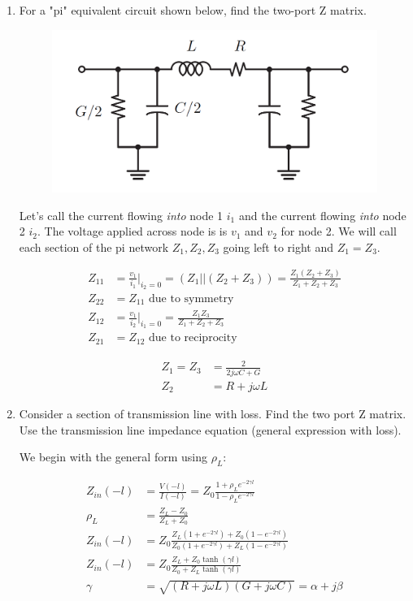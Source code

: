 \documentclass[11pt]{article}
\begin{document}
\begin{enumerate}
	\item For a "pi" equivalent circuit shown below, find the two-port Z matrix.
	\begin{figure}[H]
		\centering \includegraphics[width=\textwidth-6cm]{images/problem2_pi_network.png}
	\end{figure}

	Let's call the current flowing \emph{into} node 1 $i_1$ and the current flowing \emph{into} node 2 $i_2$. The voltage applied across node is is $v_1$ and $v_2$ for node 2. We will call each section of the pi network $Z_1, Z_2, Z_3$ going left to right and $Z_1 = Z_3$.
	
	\begin{align*}
		Z_{11} &= \frac{v_1}{i_1} \bigg\rvert_{i_2 = 0} = (Z_1 || (Z_2 + Z_3)) = \frac{Z_1(Z_2 + Z_3)}{Z_1 + Z_2 + Z_3} \\
		Z_{22} &= Z_{11} \text{ due to symmetry} \\
		Z_{12} &= \frac{v_1}{i_2} \bigg\rvert_{i_1 = 0} = \frac{Z_1 Z_3}{Z_1 + Z_2 + Z_3} \\
		Z_{21} &= Z_{12} \text{ due to reciprocity}
	\end{align*}
	
	\begin{align*}
		Z_1 = Z_3 &= \frac{2}{2j \omega C + G} \\
		Z_2 &= R + j \omega L
	\end{align*}
	
	\item Consider a section of transmission line with loss. Find the two port Z matrix. Use the transmission line impedance equation (general expression with loss).
	
	We begin with the general form using $\rho_L$:
	
	\begin{align*}
		Z_{in}(-l) &= \frac{V(-l)}{I(-l)} = Z_0 \frac{1 + \rho_L e^{-2 \gamma l}}{1 - \rho_L e^{-2 \gamma l}} \\
		\rho_L &= \frac{Z_L - Z_0}{Z_L + Z_0} \\
		Z_{in}(-l) &= Z_0 \frac{Z_L(1 + e^{-2 \gamma l}) + Z_0(1 - e^{-2 \gamma l})}{Z_0(1 + e^{-2 \gamma l}) + Z_L(1 - e^{-2 \gamma l})} \\
		Z_{in}(-l) &= Z_0 \frac{Z_L + Z_0 \tanh(\gamma l)}{Z_0 + Z_L \tanh(\gamma l)} \\
		\gamma &= \sqrt{(R + j \omega L)(G + j \omega C)} = \alpha + j \beta
	\end{align*}
	

\end{enumerate}
\end{document}

